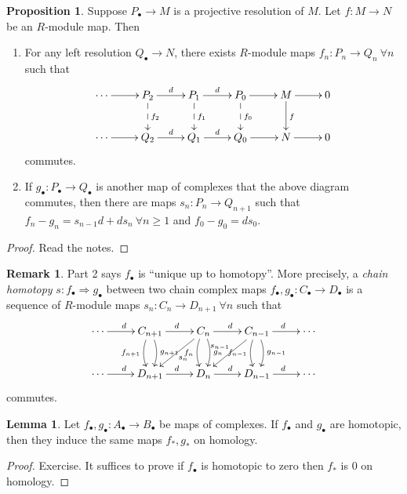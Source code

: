\documentclass{article}
\theoremstyle{definition}
\newtheorem{prop}[defn]{Proposition}
\newtheorem{lemma}[defn]{Lemma}
\newtheorem{remark}[defn]{Remark}
\begin{document}
\begin{prop}
\label{prop:modmapsindunicompmapsuptohomotopy}
Suppose $P_\bullet\rightarrow M$ is a projective resolution of $M$. Let $f:M\rightarrow N$ be an $R$-module map. Then
\begin{enumerate}
\item For any left resolution $Q_\bullet\rightarrow N$, there exists $R$-module maps $f_n:P_n\rightarrow Q_n \ \forall n$ such that
\[
\xymatrix{
\cdots\ar[r] & P_2\ar[r]^d\ar@{-->}[d]^{f_2} & P_1\ar[r]^d\ar@{-->}[d]^{f_1} & P_0\ar[r]\ar@{-->}[d]^{f_0} & M\ar[r]\ar[d]^f & 0 \\
\cdots\ar[r] & Q_2\ar[r]^d & Q_1\ar[r]^d & Q_0\ar[r] & N\ar[r] & 0 \\
}
\]
commutes.
\item If $g_\bullet:P_\bullet\rightarrow Q_\bullet$ is another map of complexes that the above diagram commutes, then there are maps $s_n:P_n\rightarrow Q_{n+1}$ such that $f_n-g_n=s_{n-1}d+ds_n \ \forall n\geq 1$ and $f_0-g_0=ds_0$.
\end{enumerate}
\end{prop}
\begin{proof}
Read the notes.
\end{proof}

\begin{remark}
\label{remark:chainhomotopy}
Part 2 says $f_\bullet$ is ``unique up to homotopy''. More precisely, a \textit{chain homotopy} $s:f_\bullet\Rightarrow g_\bullet$ between two chain complex maps $f_\bullet,g_\bullet:C_\bullet\rightarrow D_\bullet$ is a sequence of $R$-module maps $s_n:C_n\rightarrow D_{n+1} \ \forall n$ such that
\[
\xymatrix{
\cdots\ar[r]^d & C_{n+1}\ar[r]^d\ar@/_/[d]_{f_{n+1}}\ar@/^/[d]^{g_{n+1}} & C_n\ar[r]^d\ar@/_/[d]_{f_n}\ar@/^/[d]^{g_n}\ar[dl]^{s_n} & C_{n-1} \ar[r]^d\ar@/_/[d]_{f_{n-1}}\ar@/^/[d]^{g_{n-1}}\ar[dl]_{s_{n-1}} & \cdots \\
\cdots\ar[r]^d & D_{n+1}\ar[r]^d & D_n\ar[r]^d & D_{n-1} \ar[r]^d & \cdots
}
\]
commutes.
\end{remark}

\begin{lemma}
\label{lemma:homotopiccompmapsindsamehomologymaps}
Let $f_\bullet,g_\bullet:A_\bullet\rightarrow B_\bullet$ be maps of complexes. If $f_\bullet$ and $g_\bullet$ are homotopic, then they induce the same maps $f_\ast,g_\ast$ on homology.
\end{lemma}
\begin{proof}
Exercise. It suffices to prove if $f_\bullet$ is homotopic to zero then $f_\ast$ is 0 on homology.
\end{proof}
\end{document}
